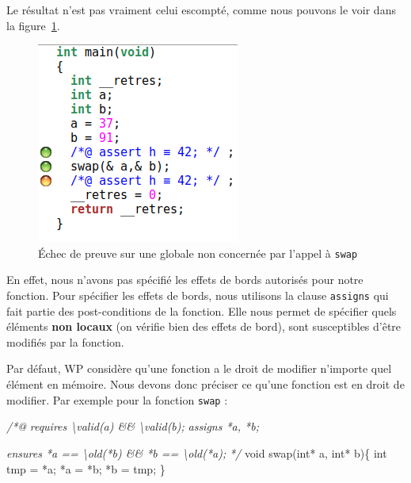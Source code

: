 \documentclass[12pt,francais,]{scrbook}
\newenvironment{Shaded}{}{}
\newcommand{\DataTypeTok}[1]{\textcolor[rgb]{0.56,0.13,0.00}{{#1}}}
\newcommand{\CommentTok}[1]{\textcolor[rgb]{0.38,0.63,0.69}{\textit{{#1}}}}
\newcommand{\NormalTok}[1]{{#1}}
\begin{document}
Le résultat n'est pas vraiment celui escompté, comme nous pouvons le
voir dans la figure~\ref{fig:2-2-2-swap-1}.

\begin{figure}[htbp]
\centering
\includegraphics[scale=0.5]{2-2-2-swap-1.png}
\caption{Échec de preuve sur une globale non concernée par l'appel à
\texttt{swap}}
\label{fig:2-2-2-swap-1}
\end{figure}

En effet, nous n'avons pas spécifié les effets de bords autorisés pour
notre fonction. Pour spécifier les effets de bords, nous utilisons la
clause \texttt{assigns} qui fait partie des post-conditions de la
fonction. Elle nous permet de spécifier quels éléments \textbf{non
locaux} (on vérifie bien des effets de bord), sont susceptibles d'être
modifiés par la fonction.

Par défaut, WP considère qu'une fonction a le droit de modifier
n'importe quel élément en mémoire. Nous devons donc préciser ce qu'une
fonction est en droit de modifier. Par exemple pour la fonction
\texttt{swap} :

\clearpage

\begin{footnotesize}\begin{Shaded}
\begin{Highlighting}[]
\CommentTok{/*@}
\CommentTok{  requires \textbackslash{}valid(a) && \textbackslash{}valid(b);}
\CommentTok{ }
\CommentTok{  assigns *a, *b;}

\CommentTok{  ensures  *a == \textbackslash{}old(*b) && *b == \textbackslash{}old(*a);}
\CommentTok{*/}
\DataTypeTok{void} \NormalTok{swap(}\DataTypeTok{int}\NormalTok{* a, }\DataTypeTok{int}\NormalTok{* b)\{}
  \DataTypeTok{int} \NormalTok{tmp = *a;}
  \NormalTok{*a = *b;}
  \NormalTok{*b = tmp;}
\NormalTok{\}}
\end{Highlighting}
\end{Shaded}\end{footnotesize}
\end{document}
